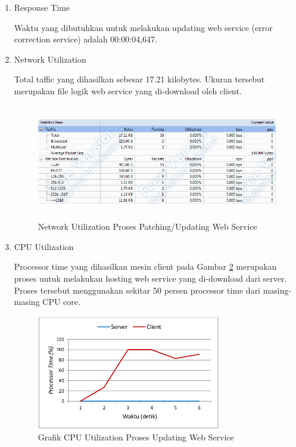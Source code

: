 \begin{enumerate}
\begin{enumerate}
\item Response Time

Waktu yang dibutuhkan untuk melakukan updating web service (error correction service) adalah 00:00:04,647.
\item Network Utilization

Total taffic yang dihasilkan sebesar 17.21 kilobytes. Ukuran tersebut merupakan file logik web service yang di-download oleh client.

\begin{figure}[H]
    \centering
    \includegraphics[height=5cm]{images/testing-3-network}
    \caption{Network Utilization Proses Patching/Updating Web Service}
    \label{fig:testing-3-network}
\end{figure}

\item CPU Utilization

Processor time yang dihasilkan mesin client pada Gambar \ref{fig:testing-3-cpu} merupakan proses untuk melakukan hosting web service yang di-download dari server. Proses tersebut menggunakan sekitar 50 persen processor time dari masing-masing CPU core.

\begin{figure}[H]
    \centering
    \includegraphics[height=5cm]{images/testing-3-cpu}
    \caption{Grafik CPU Utilization Proses Updating Web Service}
    \label{fig:testing-3-cpu}
\end{figure}
\end{enumerate}
\end{enumerate}
